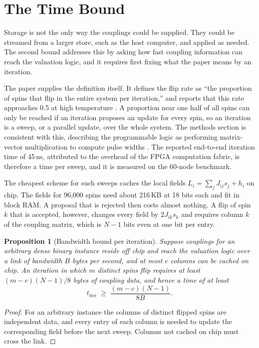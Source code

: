 \documentclass[11pt]{article}
\newtheorem{proposition}{Proposition}
\theoremstyle{definition}
\theoremstyle{remark}
\begin{document}
\section{The Time Bound}

Storage is not the only way the couplings could be supplied. They could be streamed from a larger store, such as the host computer, and applied as needed. The second bound addresses this by asking how fast coupling information can reach the valuation logic, and it requires first fixing what the paper means by an iteration.

The paper supplies the definition itself. It defines the flip rate as ``the proportion of spins that flip in the entire system per iteration,'' and reports that this rate approaches 0.5 at high temperature \cite{li2026}. A proportion near one half of all spins can only be reached if an iteration proposes an update for every spin, so an iteration is a sweep, or a parallel update, over the whole system. The methods section is consistent with this, describing the programmable logic as performing matrix-vector multiplication to compute pulse widths \cite{li2026}. The reported end-to-end iteration time of 45\,ns, attributed to the overhead of the FPGA computation fabric, is therefore a time per sweep, and it is measured on the 60-node benchmark.

The cheapest scheme for such sweeps caches the local fields $L_i = \sum_j J_{ij} s_j + h_i$ on chip. The fields for 96,000 spins need about 216\,KB at 18 bits each and fit in block RAM. A proposal that is rejected then costs almost nothing. A flip of spin $k$ that is accepted, however, changes every field by $2J_{ik}s_k$ and requires column $k$ of the coupling matrix, which is $N - 1$ bits even at one bit per entry.

\begin{proposition}[Bandwidth bound per iteration]\label{prop:time}
Suppose couplings for an arbitrary dense binary instance reside off chip and reach the valuation logic over a link of bandwidth $B$ bytes per second, and at most $c$ columns can be cached on chip. An iteration in which $m$ distinct spins flip requires at least $(m - c)(N-1)/8$ bytes of coupling data, and hence a time of at least
\begin{equation}
t_{\mathrm{iter}} \;\geq\; \frac{(m - c)(N - 1)}{8B}.
\end{equation}
\end{proposition}

\begin{proof}
For an arbitrary instance the columns of distinct flipped spins are independent data, and every entry of each column is needed to update the corresponding field before the next sweep. Columns not cached on chip must cross the link.
\end{proof}
\end{document}
